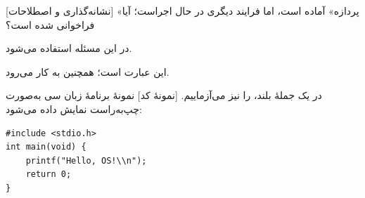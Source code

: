 \documentclass[12pt,a4paper]{article}
\begin{document}
\OSMakeQuestionTitle
\OSAnswerHeading
{}[نشانه‌گذاری و اصطلاحات]
«پردازه» آماده است، اما فرایند دیگری در حال اجراست؛ آیا  فراخوانی شده است؟

 در این مسئله استفاده می‌شود.

این عبارت  است؛ همچنین  به کار می‌رود.

در یک جملهٔ بلند،  را نیز می‌آزماییم.
[نمونهٔ کد]
نمونهٔ برنامهٔ زبان سی به‌صورت چپ‌به‌راست نمایش داده می‌شود:
\begin{latin}
\begin{lstlisting}[style=OSCode]
#include <stdio.h>
int main(void) {
    printf("Hello, OS!\\n");
    return 0;
}
\end{lstlisting}
\end{latin}
\end{document}
